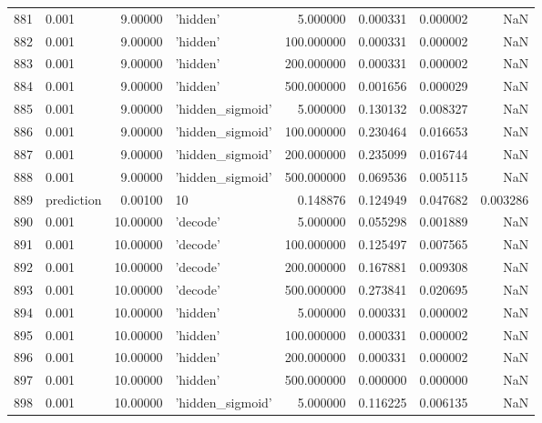 \documentclass[10pt,a4paper]{article}
\begin{document}
\begin{tabular}{llrlrrrr}
881  &       0.001 &   9.00000 &           'hidden' &    5.000000 &  0.000331 &  0.000002 &       NaN \\
882  &       0.001 &   9.00000 &           'hidden' &  100.000000 &  0.000331 &  0.000002 &       NaN \\
883  &       0.001 &   9.00000 &           'hidden' &  200.000000 &  0.000331 &  0.000002 &       NaN \\
884  &       0.001 &   9.00000 &           'hidden' &  500.000000 &  0.001656 &  0.000029 &       NaN \\
885  &       0.001 &   9.00000 &   'hidden\_sigmoid' &    5.000000 &  0.130132 &  0.008327 &       NaN \\
886  &       0.001 &   9.00000 &   'hidden\_sigmoid' &  100.000000 &  0.230464 &  0.016653 &       NaN \\
887  &       0.001 &   9.00000 &   'hidden\_sigmoid' &  200.000000 &  0.235099 &  0.016744 &       NaN \\
888  &       0.001 &   9.00000 &   'hidden\_sigmoid' &  500.000000 &  0.069536 &  0.005115 &       NaN \\
889  &  prediction &   0.00100 &                 10 &    0.148876 &  0.124949 &  0.047682 &  0.003286 \\
890  &       0.001 &  10.00000 &           'decode' &    5.000000 &  0.055298 &  0.001889 &       NaN \\
891  &       0.001 &  10.00000 &           'decode' &  100.000000 &  0.125497 &  0.007565 &       NaN \\
892  &       0.001 &  10.00000 &           'decode' &  200.000000 &  0.167881 &  0.009308 &       NaN \\
893  &       0.001 &  10.00000 &           'decode' &  500.000000 &  0.273841 &  0.020695 &       NaN \\
894  &       0.001 &  10.00000 &           'hidden' &    5.000000 &  0.000331 &  0.000002 &       NaN \\
895  &       0.001 &  10.00000 &           'hidden' &  100.000000 &  0.000331 &  0.000002 &       NaN \\
896  &       0.001 &  10.00000 &           'hidden' &  200.000000 &  0.000331 &  0.000002 &       NaN \\
897  &       0.001 &  10.00000 &           'hidden' &  500.000000 &  0.000000 &  0.000000 &       NaN \\
898  &       0.001 &  10.00000 &   'hidden\_sigmoid' &    5.000000 &  0.116225 &  0.006135 &       NaN \\

\end{tabular}
\end{document}
